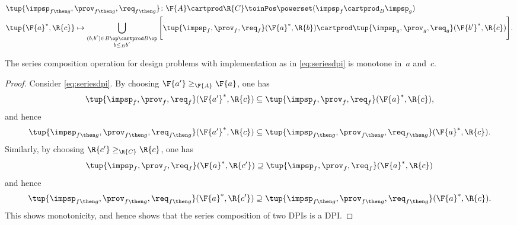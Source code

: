 {\begin{definition}
\begin{widepar}
\begin{equation}
				\begin{aligned}
					 & \tup{\impsp_{f\then g},\prov_{f\then g},\req_{f\then g}}\colon \F{A}\cartprod \R{C} \toinPos \powerset(\impsp_f \cartprod_B \impsp_g) \\
					 & \tup{\F{a}^*,\R{c}} \mapsto \bigcup_{\substack{(b,b') \in B\op \cartprod B\op                                                         \\ b \leq_B b'}} \Bigg[ \tup{\impsp_f,\prov_f,\req_f}(\F{a}^*,\R{b}) \cartprod \tup{\impsp_g,\prov_g,\req_g}(\F{b'}^*,\R{c}) \Bigg].
				\end{aligned}
			\end{equation}
		\end{widepar}
	\end{definition}

	\begin{lemma}
		The series composition operation for design problems with implementation as in \cref{eq:seriesdpi} is monotone in~$a$ and~$c$.
	\end{lemma}
	\begin{proof}
		Consider \cref{eq:seriesdpi}.
		By choosing $\F{a'}\geq_\F{A} \F{a}$, one has
		\begin{equation}
			\tup{\impsp_{f},\prov_{f},\req_{f}}(\F{a'}^*,\R{c})\subseteq \tup{\impsp_{f},\prov_{f},\req_{f}}(\F{a}^*,\R{c}),
		\end{equation}
		and hence
		\begin{equation}
			\tup{\impsp_{f\then g},\prov_{f\then g},\req_{f\then g}}(\F{a'}^*,\R{c})\subseteq \tup{\impsp_{f\then g},\prov_{f\then g},\req_{f\then g}}(\F{a}^*,\R{c}).
		\end{equation}
		Similarly, by choosing $\R{c'}\geq_{\R{C}} \R{c}$, one has
		\begin{equation}
			\tup{\impsp_{f},\prov_{f},\req_{f}}(\F{a}^*,\R{c'})\supseteq \tup{\impsp_{f},\prov_{f},\req_{f}}(\F{a}^*,\R{c})
		\end{equation}
		and hence
		\begin{equation}
			\tup{\impsp_{f\then g},\prov_{f\then g},\req_{f\then g}}(\F{a}^*,\R{c'})\supseteq \tup{\impsp_{f\then g},\prov_{f\then g},\req_{f\then g}}(\F{a}^*,\R{c}).
		\end{equation}
		This shows monotonicity, and hence shows that the series composition of two DPIs is a DPI.
	\end{proof}

}
